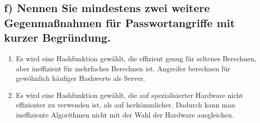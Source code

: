 \subsection{f) Nennen Sie mindestens zwei weitere Gegenmaßnahmen für Passwortangriffe mit kurzer Begründung.}
\begin{enumerate}
    \item Es wird eine Hashfunktion gewählt, die effizient genug für seltenes Berechnen, aber ineffizient für mehrfaches Berechnen ist. Angreifer berechnen für gewöhnlich häufiger Hashwerte als Server.
    \item Es wird eine Hashfunktion gewählt, die auf spezialisierter Hardware nicht effizienter zu verwenden ist, als auf herkömmlicher. Dadurch kann man ineffiziente Algorithmen nicht mit der Wahl der Hardware ausgleichen.
\end{enumerate}





